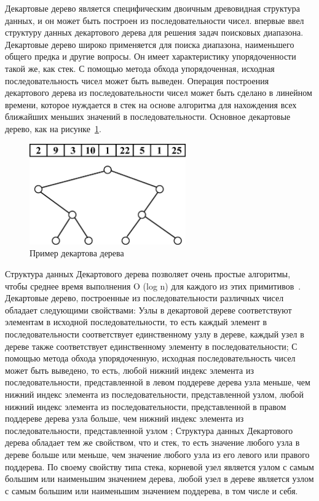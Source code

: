 \documentclass[specification,annotation,times]{itmo-student-thesis}
\newcommand{\revise}[1]{{\color{red!70!black} #1 }}
\begin{document}
\revise{
Декартовые дерево является специфическим двоичным древовидная структура данных, и он может быть построен из последовательности чисел. \cite{cartesian-tree} впервые ввел структуру данных декартового дерева 
для решения задач поисковых диапазона. Декартовые дерево широко применяется для поиска диапазона, наименьшего общего предка и другие вопросы. Он имеет характеристику упорядоченности такой же, как стек. С 
помощью метода обхода упорядоченная, исходная последовательность чисел может быть выведен. Операция построения декартового дерева из последовательности чисел может быть сделано в линейном времени, которое 
нуждается в стек на основе алгоритма для нахождения всех ближайших меньших значений в последовательности. Основное декартовые дерево, как на рисунке~\ref{fig:cartesian-idea}.
}

\begin{figure}[!ht]
\centering
\includegraphics[width=0.6\textwidth]{pic/cartesian-tree-idea.png}
\caption{Пример декартова дерева}\label{fig:cartesian-idea}
\end{figure}

\revise{
Структура данных Декартового дерева позволяет очень простые алгоритмы, чтобы среднее время выполнения O (log n) для каждого из этих примитивов~\cite{cartesian-tree}. Декартовые дерево, построенные из 
последовательности различных чисел обладает следующими свойствами: Узлы в декартовой дереве соответствуют элементам в исходной последовательности, то есть каждый элемент в последовательности соответствует 
единственному узлу в дереве, каждый узел в дереве также соответствует единственному элементу в последовательности; С помощью метода обхода упорядоченную, исходная последовательность чисел может быть 
выведено, то есть, любой нижний индекс элемента из последовательности, представленной в левом поддереве дерева узла меньше, чем нижний индекс элемента из последовательности, представленной узлом, любой 
нижний индекс элемента из последовательности, представленной в правом поддереве дерева узла больше, чем нижний индекс элемента из последовательности, представленной узлом ; Структура данных Декартового 
дерева обладает тем же свойством, что и стек, то есть значение любого узла в дереве больше или меньше, чем значение любого узла из его левого или правого поддерева. По своему свойству типа стека, корневой 
узел является узлом с самым большим или наименьшим значением дерева, любой узел в дереве является узлом с самым большим или наименьшим значением поддерева, в том числе и себя.
}
\end{document}
